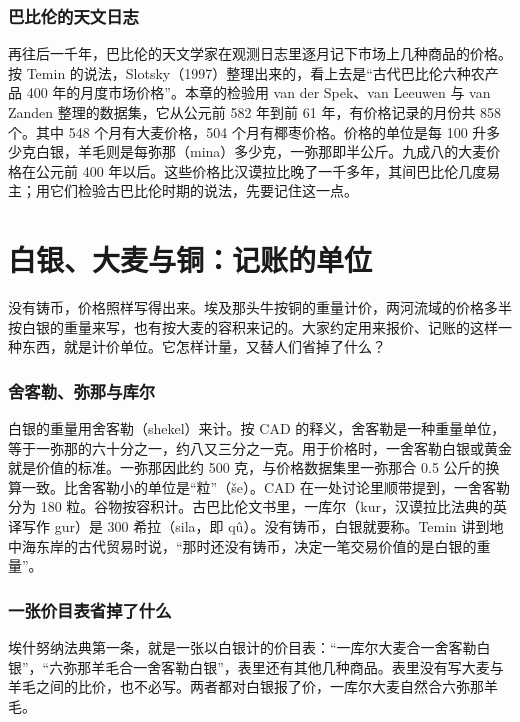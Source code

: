 \subsubsection{巴比伦的天文日志}
再往后一千年，巴比伦的天文学家在观测日志里逐月记下市场上几种商品的价格\cite{temin2003}。按 Temin 的说法，Slotsky（1997）\cite{slotsky1997}整理出来的，看上去是“古代巴比伦六种农产品 400 年的月度市场价格”\cite{temin2003}。本章的检验用 van der Spek、van Leeuwen 与 van Zanden 整理的数据集，它从公元前 582 年到前 61 年，有价格记录的月份共 858 个。其中 548 个月有大麦价格，504 个月有椰枣价格。价格的单位是每 100 升多少克白银，羊毛则是每弥那（mina）多少克，一弥那即半公斤\cite{vdspek2014}。九成八的大麦价格在公元前 400 年以后。这些价格比汉谟拉比晚了一千多年，其间巴比伦几度易主；用它们检验古巴比伦时期的说法，先要记住这一点。

\section{白银、大麦与铜：记账的单位}\label{sec:meso-unit}

没有铸币，价格照样写得出来。埃及那头牛按铜的重量计价，两河流域的价格多半按白银的重量来写，也有按大麦的容积来记的。大家约定用来报价、记账的这样一种东西，就是计价单位。它怎样计量，又替人们省掉了什么？

\subsubsection{舍客勒、弥那与库尔}
白银的重量用舍客勒（shekel）来计。按 CAD 的释义，舍客勒是一种重量单位，等于一弥那的六十分之一，约八又三分之一克。用于价格时，一舍客勒白银或黄金就是价值的标准\cite{cad_sh3}。一弥那因此约 500 克，与价格数据集里一弥那合 0.5 公斤的换算一致\cite{vdspek2014}。比舍客勒小的单位是“粒”（še）。CAD 在一处讨论里顺带提到，一舍客勒分为 180 粒\cite{cad_k}。谷物按容积计。古巴比伦文书里，一库尔（kur，汉谟拉比法典的英译写作 gur）是 300 希拉（sila，即 qû）\cite{cad_k}。没有铸币，白银就要称。Temin 讲到地中海东岸的古代贸易时说，“那时还没有铸币，决定一笔交易价值的是白银的重量”\cite{temin2003}。

\subsubsection{一张价目表省掉了什么}
埃什努纳法典第一条，就是一张以白银计的价目表：“一库尔大麦合一舍客勒白银”，“六弥那羊毛合一舍客勒白银”，表里还有其他几种商品\cite{cad_sh3}。表里没有写大麦与羊毛之间的比价，也不必写。两者都对白银报了价，一库尔大麦自然合六弥那羊毛。

